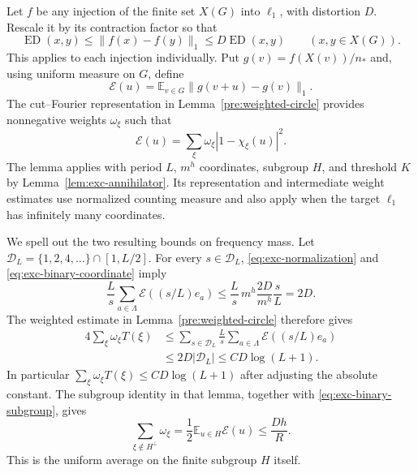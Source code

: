 Let $f$ be any injection of the finite set $X(G)$ into $\ell_1$, with
distortion $D$.  Rescale it by its contraction factor so that
\begin{equation}\label{eq:exc-normalization}
 \operatorname{ED}(x,y)\le\|f(x)-f(y)\|_1
       \le D\operatorname{ED}(x,y)
 \qquad(x,y\in X(G)).
\end{equation}
This applies to each injection individually.  Put $g(v)=f(X(v))/n_*$
and, using uniform measure on $G$, define
\[
 \mathcal E(u)=\mathbb E_{v\in G}\|g(v+u)-g(v)\|_1 .
\]
The cut--Fourier representation in Lemma~\ref{pre:weighted-circle}
provides nonnegative weights $\omega_\xi$ such that
\begin{equation}\label{eq:exc-fourier-energy}
 \mathcal E(u)=\sum_\xi\omega_\xi|1-\chi_\xi(u)|^2 .
\end{equation}
The lemma applies with period $L$, $m^h$ coordinates, subgroup $H$,
and threshold $K$ by Lemma~\ref{lem:exc-annihilator}.  Its representation
and intermediate weight estimates use normalized counting measure and
also apply when the target $\ell_1$ has infinitely many coordinates.

We spell out the two resulting bounds on frequency mass.  Let
$\mathcal D_L=\{1,2,4,\ldots\}\cap[1,L/2]$.  For every $s\in\mathcal D_L$,
\eqref{eq:exc-normalization} and \eqref{eq:exc-binary-coordinate} imply
\[
 \frac Ls\sum_{a\in\Lambda}\mathcal E((s/L)e_a)
 \le \frac Ls\,m^h\frac{2D}{m^h}\frac{s}{L}=2D.
\]
The weighted estimate in Lemma~\ref{pre:weighted-circle} therefore
gives
\begin{equation}\label{eq:exc-weighted-mass}
 \begin{aligned}
 4\sum_\xi\omega_\xi T(\xi)
 &\le\sum_{s\in\mathcal D_L}\frac Ls
           \sum_{a\in\Lambda}\mathcal E((s/L)e_a)\\
 &\le 2D|\mathcal D_L|
 \le C D\log(L+1).
 \end{aligned}
\end{equation}
In particular $\sum_\xi\omega_\xi T(\xi)\le C D\log(L+1)$ after adjusting
the absolute constant.  The subgroup identity in that lemma, together
with \eqref{eq:exc-binary-subgroup}, gives
\begin{equation}\label{eq:exc-off-annihilator}
 \sum_{\xi\notin H^\perp}\omega_\xi
 =\frac12\mathbb E_{u\in H}\mathcal E(u)
 \le \frac{Dh}{R}.
\end{equation}
This is the uniform average on the finite subgroup $H$ itself.

